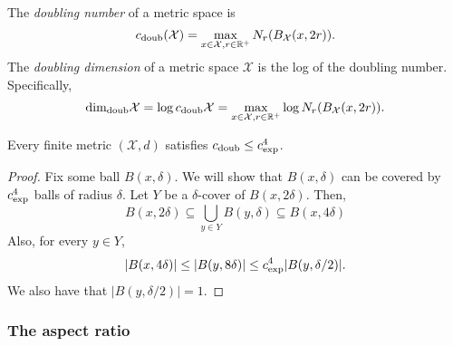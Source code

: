 \documentclass[../main.tex]{subfiles}
\newcommand{\set}[1]{\mathcal {#1}}
\newcommand{\radius}{r}
\newcommand{\krdim}{\text{dim}_\textnormal{kr}}
\newcommand{\doubdim}{\text{dim}_\textnormal{doub}}
\newcommand{\krnum}{c_\textnormal{exp}}
\newcommand{\doubnum}{c_\textnormal{doub}}
\begin{document}
\begin{definition}
    The \emph{doubling number} of a metric space is
    \begin{equation}
        \doubnum(\set X) = \max_{x\in\set X, \radius\in\R^+} N_\radius(B_{\set X}(x,2\radius))
        .
    \end{equation}
    The \emph{doubling dimension} of a metric space $\set X$ is the log of the doubling number.
    Specifically,
    \begin{equation}
        \doubdim \set X = \log \doubnum\set X = \max_{x\in\set X, \radius\in\R^+} \log N_\radius(B_{\set X}(x,2\radius))
        .
    \end{equation}
\end{definition}
\cite{gupta2003bounded}

\begin{lemma}
    Every finite metric $(\set X,d)$ satisfies
    $\doubnum \le \krnum^4$.
\end{lemma}
\begin{proof}
    Fix some ball $B(x,\delta)$.
    We will show that $B(x,\delta)$ can be covered by $\krnum^4$ balls of radius $\delta$.
    Let $Y$ be a $\delta$-cover of $B(x,2\delta)$.
    Then,
    \begin{equation}
        B(x,2\delta) 
        \subseteq 
        \bigcup\limits_{y\in Y} B(y,\delta) 
        \subseteq
        B(x,4\delta)
    \end{equation}
    Also, for every $y\in Y$,
    \begin{equation}
        |B(x,4\delta)| 
        \le 
        |B(y,8\delta)| 
        \le 
        \krnum^4 |B(y,\delta/2)|
        .
    \end{equation}
    We also have that $|B(y,\delta/2)|=1$.
\end{proof}


\subsubsection{The aspect ratio}
\end{document}
